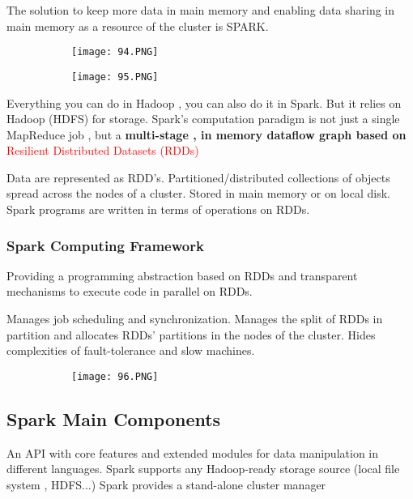 \documentclass{article}
\begin{document}
The solution to keep more data in main memory and enabling data sharing in main memory as a resource of the cluster is SPARK.

\begin{figure}[ht!]
  \centering
  \begin{subfigure}[b]{0.5\linewidth}
    \texttt{[image: 94.PNG]}
  \end{subfigure}
     \begin{subfigure}[b]{0.4\textwidth}
         \centering
         \texttt{[image: 95.PNG]}
     \end{subfigure}
\end{figure}

Everything you can do in Hadoop , you can also do it in Spark. But it relies on Hadoop (HDFS) for storage.
Spark's computation paradigm is not just a single MapReduce job , but a \textbf{multi-stage , in memory dataflow graph based on} \textcolor{red}{Resilient Distributed Datasets (RDDs)}

Data are represented as RDD's. Partitioned/distributed collections of objects spread across the nodes of a cluster.
Stored in main memory or on local disk.
Spark programs are written in terms of operations on RDDs.

\subsubsection{Spark Computing Framework}
Providing a programming abstraction based on RDDs and transparent mechanisms to execute code in parallel on RDDs.

Manages job scheduling and synchronization.
Manages the split of RDDs in partition and allocates RDDs' partitions in the nodes of the cluster.
Hides complexities of fault-tolerance and slow machines.


\begin{figure}[ht!]
  \centering
  \begin{subfigure}[b]{0.5\linewidth}
    \texttt{[image: 96.PNG]}
  \end{subfigure}
\end{figure}

\subsection{Spark Main Components}
An API with core features and extended modules for data manipulation in different languages.
Spark supports any Hadoop-ready storage source (local file system , HDFS...)
Spark provides a stand-alone cluster manager
\end{document}
